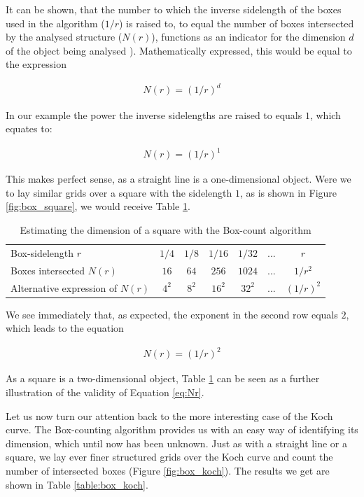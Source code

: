\documentclass{article}[12pt]
\begin{document}
It can be shown, that the number to which the inverse sidelength of the boxes used in the algorithm ($1/r$) is raised to, to equal the number of boxes intersected by the analysed structure ($N(r)$), functions as an indicator for the dimension $d$ of the object being analysed )\citep{falconer2013fractals}. Mathematically expressed, this would be equal to the expression

\begin{align}
N(r) = (1/r)^d
\label{eq:Nr}
\end{align}

In our example the power the inverse sidelengths are raised to equals $1$, which equates to:

\begin{align}
N(r) = (1/r)^1
\end{align}

This makes perfect sense, as a straight line is a one-dimensional object. Were we to lay similar grids over a square with the sidelength $1$, as is shown in Figure  \ref{fig:box_square}, we would receive Table \ref{table:box_square}.

\begin{table}[!ht]
\begin{tabular}{p{3cm}cccccc}
&&&&&&\\
\hline
\hline
Box-sidelength $r$ &  $1/4$ & $1/8$ & $1/16$ &  $1/32$ & $...$ & $r$\\
\hline
Boxes  \newline intersected $N(r)$  & $16$ & $64$ & $256$ & $1024$ & $...$ & $1/r^2$\\
Alternative \newline expression of $N(r)$ & $ 4^2$ & $8^2$  & $16^2$  & $32^2$ & $...$ & $(1/r)^2$ \\
\hline
\hline
\end{tabular}
\caption{Estimating the dimension of a square with the Box-count algorithm}
\label{table:box_square}
\end{table}

We see immediately that, as expected, the exponent in the second row equals $2$, which leads to the equation 

\begin{align}
N(r) = (1/r)^2
\end{align}

As a square is a two-dimensional object, Table \ref{table:box_square} can be seen as a further illustration of the validity of Equation \ref{eq:Nr}.

Let us now turn our attention back to the more interesting case of the Koch curve. The Box-counting algorithm provides us with an easy way of identifying its dimension, which until now has been unknown. Just as with a straight line or a square, we lay ever finer structured grids over the Koch curve and count the number of intersected boxes (Figure \ref{fig:box_koch}). The results we get are shown in Table \ref{table:box_koch}.
\end{document}
